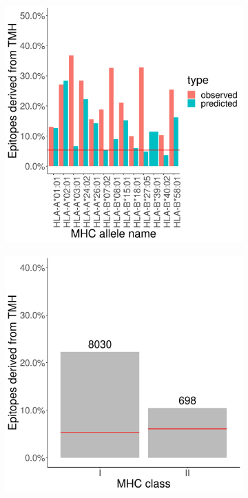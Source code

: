 %
%
\begin{figure}[!htbp]
  \centering
  \begin{subfigure}[t]{0.45\textwidth}
    \centering
    \caption{}
    \includegraphics[width=1.0\textwidth]{bbbq_article_issue_157/figure_2a.png}
    \label{fig:2a}
  \end{subfigure}  
  \hfill
  \begin{subfigure}[t]{0.45\textwidth}
    \centering
    \caption{}
    \includegraphics[width=1.0\textwidth]{bbbq_article_issue_157/figure_2b.png}
    \label{fig:2b}
  \end{subfigure}  


\end{figure}
